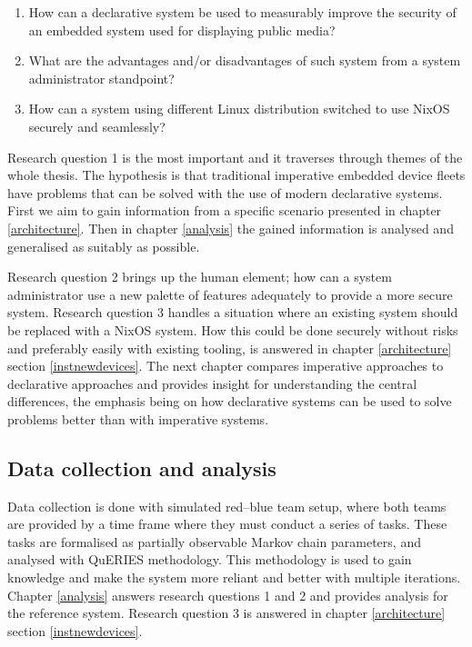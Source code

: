 \begin{enumerate}
\item How can a declarative system be used to measurably improve the
  security of an embedded system used for displaying public media?
\item What are the advantages and/or disadvantages of such system from
  a system administrator standpoint?
\item How can a system using different Linux distribution switched to use NixOS securely and seamlessly?
\end{enumerate}

Research question 1 is the most important and it traverses through
themes of the whole thesis. The hypothesis is that traditional
imperative embedded device fleets have problems that can be solved
with the use of modern declarative systems. First we aim to gain
information from a specific scenario presented in chapter
\ref{architecture}. Then in chapter \ref{analysis} the gained
information is analysed and generalised as suitably as possible.

Research question 2 brings up the human element; how can a system
administrator use a new palette of features adequately to provide a more
secure system. Research question 3 handles a situation where
an existing system should be replaced with a NixOS system. How this could
be done securely without risks and preferably easily with existing
tooling, is answered in chapter \ref{architecture} section
\ref{instnewdevices}. The next chapter compares imperative approaches
to declarative approaches and provides insight for understanding the
central differences, the emphasis being on how declarative systems can be
used to solve problems better than with imperative systems.

\subsection{Data collection and analysis}

Data collection is done with simulated red–blue team setup, where both
teams are provided by a time frame where they must conduct a series of
tasks. These tasks are formalised as partially observable Markov chain
parameters, and analysed with QuERIES methodology. This methodology is
used to gain knowledge and make the system more reliant and better
with multiple iterations. Chapter \ref{analysis} answers research
questions 1 and 2 and provides analysis for the reference
system. Research question 3 is answered in chapter \ref{architecture}
section \ref{instnewdevices}.
